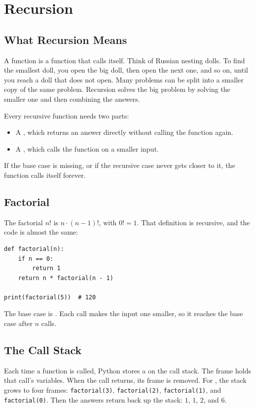 \chapter{Recursion}

\section{What Recursion Means}
A  function is a function that calls itself. Think of Russian nesting dolls. To find the smallest doll, you open the big doll, then open the next one, and so on, until you reach a doll that does not open.
Many problems can be split into a smaller copy of the same problem. Recursion
solves the big problem by solving the smaller one and then combining the answers.

Every recursive function needs two parts:
\begin{itemize}
\item A , which returns an answer directly
without calling the function again.
\item A , which calls the function on a smaller input.
\end{itemize}
If the base case is missing, or if the recursive case never gets closer to it,
the function calls itself forever.

\section{Factorial}
The factorial $n!$ is $n \cdot (n - 1)!$, with $0! = 1$. That definition is
recursive, and the code is almost the same:

\begin{verbatim}
def factorial(n):
    if n == 0:
        return 1
    return n * factorial(n - 1)

print(factorial(5))  # 120
\end{verbatim}

The base case is . Each call makes the input one smaller, so it
reaches the base case after $n$ calls.

\section{The Call Stack}
Each time a function is called, Python stores a  on the call
stack. The frame holds that call's variables. When the call returns, its frame
is removed. For , the stack grows to four frames:
\texttt{factorial(3)}, \texttt{factorial(2)}, \texttt{factorial(1)}, and
\texttt{factorial(0)}. Then the answers return back up the stack: $1$, $1$, $2$, and $6$.

